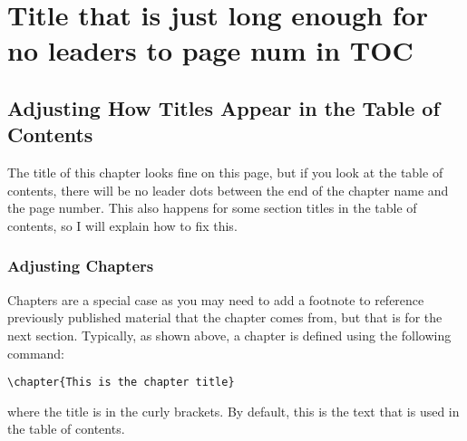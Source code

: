

\chapter{Title that is just long enough for no leaders to page num in TOC}

%

%

\section{Adjusting How Titles Appear in the Table of Contents}
The title of this chapter looks fine on this page, but if you look at the table of contents, there will be no leader dots between the end of the chapter name and the page number.
This also happens for some section titles in the table of contents, so I will explain how to fix this.

\subsection{Adjusting Chapters}
Chapters are a special case as you may need to add a footnote to reference previously published material that the chapter comes from, but that is for the next section.
Typically, as shown above, a chapter is defined using the following command:
\begin{verbatim}
\chapter{This is the chapter title}
\end{verbatim}
where the title is in the curly brackets.
By default, this is the text that is used in the table of contents.

